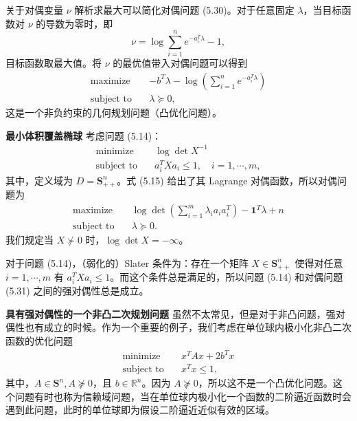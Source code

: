 \documentclass[UTF8, 12pt, fontset=fandol, oneside]{ctexart}
\begin{document}
关于对偶变量 $\nu$ 解析求最大可以简化对偶问题 (5.30)。对于任意固定 $\lambda$，当目标函数对 $\nu$ 的导数为零时，即
\[
\nu=\log\sum_{i=1}^n e^{-a_i^T\lambda}-1,
\]
目标函数取最大值。将 $\nu$ 的最优值带入对偶问题可以得到
\[
\begin{aligned}
\text{maximize}\quad & -b^T\lambda-\log\left(\sum_{i=1}^n e^{-a_i^T\lambda}\right)\\
\text{subject to}\quad & \lambda\succeq 0,
\end{aligned}
\]
这是一个非负约束的几何规划问题（凸优化问题）。

\noindent\textbf{最小体积覆盖椭球}\quad
考虑问题 (5.14)：
\[
\begin{aligned}
\text{minimize}\quad & \log\det X^{-1}\\
\text{subject to}\quad & a_i^T X a_i\leq 1,\quad i=1,\cdots,m,
\end{aligned}
\]
其中，定义域为 $D=\mathbf{S}_{++}^n$。式 (5.15) 给出了其 Lagrange 对偶函数，所以对偶问题为
\begin{equation}
\begin{aligned}
\text{maximize}\quad & \log\det\left(\sum_{i=1}^m\lambda_i a_i a_i^T\right)-\mathbf{1}^T\lambda+n\\
\text{subject to}\quad & \lambda\succeq 0.
\end{aligned}
\tag{5.31}
\end{equation}
我们规定当 $X\not\succ 0$ 时，$\log\det X=-\infty$。

对于问题 (5.14)，（弱化的）Slater 条件为：存在一个矩阵 $X\in\mathbf{S}_{++}^n$ 使得对任意 $i=1,\cdots,m$ 有 $a_i^TXa_i\leq 1$。而这个条件总是满足的，所以问题 (5.14) 和对偶问题 (5.31) 之间的强对偶性总是成立。

\noindent\textbf{具有强对偶性的一个非凸二次规划问题}\quad
虽然不太常见，但是对于非凸问题，强对偶性也有成立的时候。作为一个重要的例子，我们考虑在单位球内极小化非凸二次函数的优化问题
\begin{equation}
\begin{aligned}
\text{minimize}\quad & x^TAx+2b^Tx\\
\text{subject to}\quad & x^Tx\leq 1,
\end{aligned}
\tag{5.32}
\end{equation}
其中，$A\in\mathbf{S}^n,A\not\succeq 0$，且 $b\in\mathbb{R}^n$。因为 $A\not\succeq 0$，所以这不是一个凸优化问题。这个问题有时也称为信赖域问题，当在单位球内极小化一个函数的二阶逼近函数时会遇到此问题，此时的单位球即为假设二阶逼近近似有效的区域。
\end{document}
